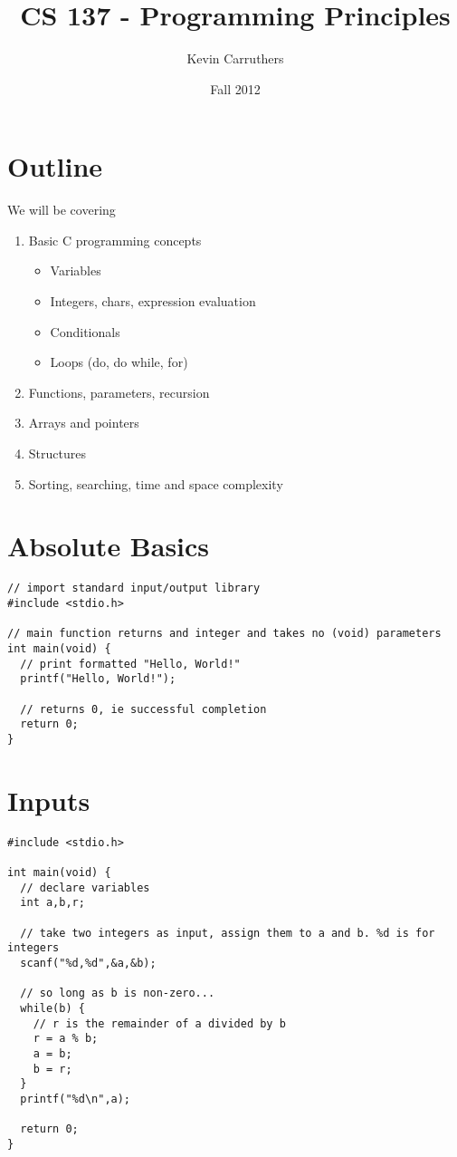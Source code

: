 \documentclass[12pt]{article}
\begin{document}
\title{CS 137 - Programming Principles}
\author{Kevin Carruthers}
\date{\vspace{-2ex}Fall 2012}
\maketitle\HRule

\section*{Outline}
We will be covering
\begin{enumerate}
\item Basic C programming concepts
\begin{itemize}
\item Variables
\item Integers, chars, expression evaluation
\item Conditionals
\item Loops (do, do while, for)
\end{itemize}
\item Functions, parameters, recursion
\item Arrays and pointers
\item Structures
\item Sorting, searching, time and space complexity
\end{enumerate}

\section*{Absolute Basics}
\begin{verbatim}
// import standard input/output library
#include <stdio.h>

// main function returns and integer and takes no (void) parameters
int main(void) {
  // print formatted "Hello, World!"
  printf("Hello, World!");
  
  // returns 0, ie successful completion
  return 0;
}
\end{verbatim}

\section*{Inputs}
\begin{verbatim}
#include <stdio.h>

int main(void) {
  // declare variables
  int a,b,r;
  
  // take two integers as input, assign them to a and b. %d is for integers
  scanf("%d,%d",&a,&b);
  
  // so long as b is non-zero...
  while(b) {
    // r is the remainder of a divided by b
    r = a % b;
    a = b;
    b = r;
  }
  printf("%d\n",a);

  return 0;
}
\end{verbatim}
\end{document}
